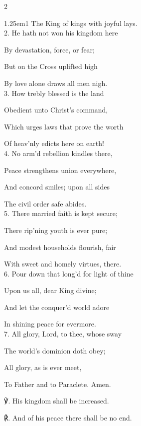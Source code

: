 \begin{paracol}{2}
\begin{hangparas}{1.25em}{1}
The King of kings with joyful lays.\\

2. He hath not won his kingdom here

By devastation, force, or fear;

But on the Cross uplifted high

By love alone draws all men nigh.\\

3. How trebly blessed is the land

Obedient unto Christ’s command,

Which urges laws that prove the worth

Of heav'nly edicts here on earth!\\

4. No arm'd rebellion kindles there,

Peace strengthens union everywhere,

And concord smiles; upon all sides

The civil order safe abides.\\

5. There married faith is kept secure;

There rip'ning youth is ever pure;

And modest households flourish, fair

With sweet and homely virtues, there.\\

6. Pour down that long'd for light of thine

Upon us all, dear King divine;

And let the conquer'd world adore

In shining peace for evermore.\\

7. All glory, Lord, to thee, whose sway

The world’s dominion doth obey;

All glory, as is ever meet,

To Father and to Paraclete. Amen.\\
\end{hangparas}

℣. His kingdom shall be increased.

℟. And of his peace there shall be no end.


\fussy	
\end{paracol}


